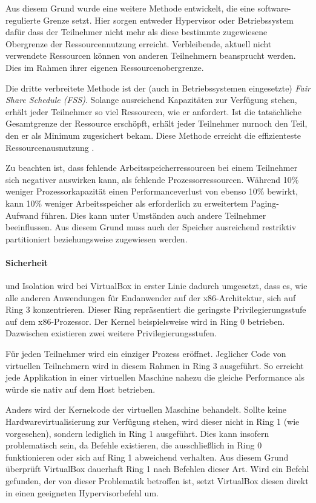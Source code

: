 Aus diesem Grund wurde eine weitere Methode entwickelt, die eine software-regulierte Grenze setzt.
Hier sorgen entweder Hypervisor oder Betriebssystem dafür dass der Teilnehmer nicht mehr als
diese bestimmte zugewiesene Obergrenze der Ressourcennutzung erreicht. Verbleibende, aktuell
nicht verwendete Ressourcen können von anderen Teilnehmern beansprucht werden. Dies im Rahmen
ihrer eigenen Ressourcenobergrenze\cite{victor10}.

Die dritte verbreitete Methode ist der (auch in Betriebssystemen eingesetzte)
\textit{Fair Share Schedule (FSS)}. Solange ausreichend Kapazitäten zur Verfügung stehen,
erhält jeder Teilnehmer so viel Ressourcen, wie er anfordert. Ist die tatsächliche Gesamtgrenze der
Ressource erschöpft, erhält jeder Teilnehmer nurnoch den Teil, den er als Minimum zugesichert bekam.
Diese Methode erreicht die effizienteste Ressourcenausnutzung \cite{victor10}.

Zu beachten ist, dass fehlende Arbeitsspeicherressourcen bei einem Teilnehmer sich negativer auswirken
kann, als fehlende Prozessorressourcen. Während 10\% weniger Prozessorkapazität einen
Performanceverlust von ebenso 10\% bewirkt, kann 10\% weniger Arbeitsspeicher als erforderlich zu
erweitertem Paging-Aufwand führen. Dies kann unter Umständen auch andere Teilnehmer beeinflussen.
Aus diesem Grund muss auch der Speicher ausreichend restriktiv partitioniert beziehungsweise zugewiesen werden.

\paragraph{Sicherheit} und Isolation wird bei VirtualBox in erster Linie dadurch umgesetzt, dass
es, wie alle anderen Anwendungen für Endanwender auf der x86-Architektur, sich auf Ring 3 konzentrieren.
Dieser Ring repräsentiert die geringste Privilegierungsstufe auf dem x86-Prozessor. Der Kernel
beispielsweise wird in Ring 0 betrieben. Dazwischen existieren zwei weitere Privilegierungsstufen.

Für jeden Teilnehmer wird ein einziger Prozess eröffnet. Jeglicher Code von virtuellen Teilnehmern
wird in diesem Rahmen in Ring 3 ausgeführt. So erreicht jede Applikation in einer virtuellen Maschine
nahezu die gleiche Performance als würde sie nativ auf dem Host betrieben.

Anders wird der Kernelcode der virtuellen Maschine behandelt. Sollte keine Hardwarevirtualisierung
zur Verfügung stehen, wird dieser nicht in Ring 1 (wie vorgesehen), sondern lediglich in Ring 1
ausgeführt. Dies kann insofern problematisch sein, da Befehle existieren, die ausschließlich
in Ring 0 funktionieren oder sich auf Ring 1 abweichend verhalten. Aus diesem Grund überprüft
VirtualBox dauerhaft Ring 1 nach Befehlen dieser Art. Wird ein Befehl gefunden, der von dieser
Problematik betroffen ist, setzt VirtualBox diesen direkt in einen geeigneten Hypervisorbefehl
um.

